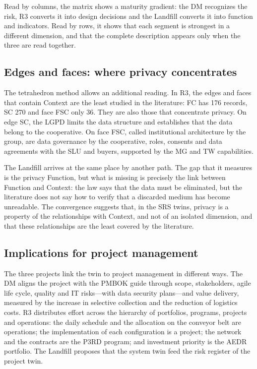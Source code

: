 \documentclass[12pt,a4paper,article,oneside,brazil,english]{abntex2}
\begin{document}
Read by columns, the matrix shows a maturity gradient: the DM recognizes the risk, R3 converts it into design decisions and the Landfill converts it into function and indicators. Read by rows, it shows that each segment is strongest in a different dimension, and that the complete description appears only when the three are read together.

\subsection{Edges and faces: where privacy concentrates}

The tetrahedron method allows an additional reading. In R3, the edges and faces that contain Context are the least studied in the literature: FC has 176 records, SC 270 and face FSC only 36. They are also those that concentrate privacy. On edge SC, the LGPD limits the data structure and establishes that the data belong to the cooperative. On face FSC, called institutional architecture by the group, are data governance by the cooperative, roles, consents and data agreements with the SLU and buyers, supported by the MG and TW capabilities.

The Landfill arrives at the same place by another path. The gap that it measures is the privacy Function, but what is missing is precisely the link between Function and Context: the law says that the data must be eliminated, but the literature does not say how to verify that a discarded medium has become unreadable. The convergence suggests that, in the SRS twins, privacy is a property of the relationships with Context, and not of an isolated dimension, and that these relationships are the least covered by the literature.

\subsection{Implications for project management}

The three projects link the twin to project management in different ways. The DM aligns the project with the PMBOK guide through scope, stakeholders, agile life cycle, quality and IT risks---with data security plans---and value delivery, measured by the increase in selective collection and the reduction of logistics costs. R3 distributes effort across the hierarchy of portfolios, programs, projects and operations: the daily schedule and the allocation on the conveyor belt are operations; the implementation of each configuration is a project; the network and the contracts are the P3RD program; and investment priority is the AEDR portfolio. The Landfill proposes that the system twin feed the risk register of the project twin.
\end{document}

